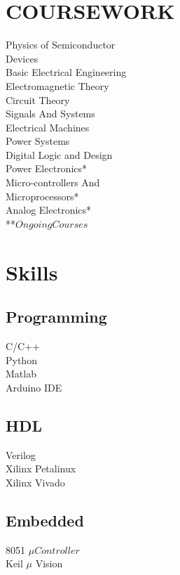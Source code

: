 \documentclass[]{deedy-resume-openfont}
\begin{document}
\begin{minipage}[t]{0.30\textwidth}
\section{COURSEWORK} 
\textbullet{}Physics of Semiconductor\\ 
\hspace{4pt} Devices\\
\textbullet{}Basic Electrical Engineering\\
\textbullet{}Electromagnetic Theory\\
\textbullet{}Circuit Theory\\
\textbullet{}Signals And Systems\\
\textbullet{}Electrical Machines\\
\textbullet{}Power Systems\\
\textbullet{}Digital Logic and Design\\
\textbullet{}Power Electronics*\\
\textbullet{}Micro-controllers And\\
\hspace{6pt}Microprocessors*\\
\textbullet{}Analog Electronics*\\
**$Ongoing Courses$\\
\sectionsep

\section{Skills}
\subsection{Programming}
\textbullet{}C/C++ \\
\textbullet{}Python\\
\textbullet{} Matlab\\ 
\textbullet{} Arduino IDE\\
\subsection{HDL}
 \textbullet{} Verilog\\
 \textbullet{} Xilinx Petalinux\\
 \textbullet{} Xilinx Vivado
\subsection{Embedded}
\textbullet{}8051 $\mu Controller$\\
\textbullet{} Keil $\mu$ Vision

\end{minipage}
\end{document}

